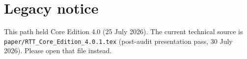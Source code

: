 \documentclass[11pt]{article}
\begin{document}
\section*{Legacy notice}
This path held Core Edition 4.0 (25 July 2026).
The current technical source is
\texttt{paper/RTT\_Core\_Edition\_4.0.1.tex}
(post-audit presentation pass, 30 July 2026).
Please open that file instead.
\end{document}

